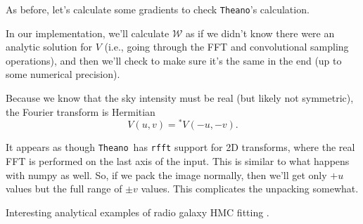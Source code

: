 \documentclass[modern]{aastex62}
\newcommand{\theano}{\texttt{Theano}}
\newcommand{\vm}{\boldsymbol{\mathcal{W}}} %
\begin{document}
As before, let's calculate some gradients to check \theano's calculation.

In our implementation, we'll calculate $\vm$ as if we didn't know there were an analytic solution for $V$ (i.e., going through the FFT and convolutional sampling operations), and then we'll check to make sure it's the same in the end (up to some numerical precision).

Because we know that the sky intensity must be real (but likely not symmetric), the Fourier transform is Hermitian
\begin{equation}
    V(u, v) = {}^*V(-u, -v).
\end{equation}

It appears as though \theano\ has \texttt{rfft} support for 2D transforms, where the real FFT is performed on the last axis of the input. This is similar to what happens with numpy as well. So, if we pack the image normally, then we'll get only $+u$ values but the full range of $\pm v$ values. This complicates the unpacking somewhat.

Interesting analytical examples of radio galaxy HMC fitting \citep{rivi19}.




\acknowledgments




\end{document}
